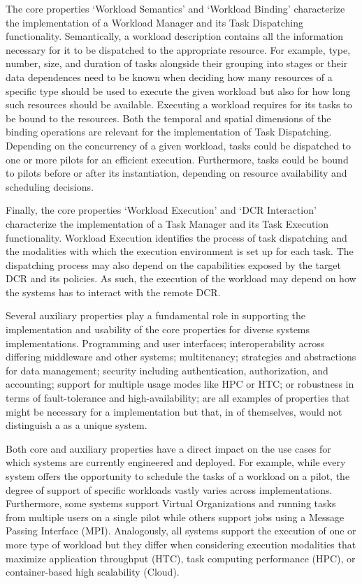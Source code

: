 \documentclass{sig-alternate}
\begin{document}
The core properties `Workload Semantics' and `Workload Binding' characterize the
implementation of a Workload Manager and its Task Dispatching functionality.
Semantically, a workload description contains all the information necessary for
it to be dispatched to the appropriate resource. For example, type, number,
size, and duration of tasks alongside their grouping into stages or their data
dependences need to be known when deciding how many resources of a specific type
should be used to execute the given workload but also for how long such
resources should be available. Executing a workload requires for its tasks to be
bound to the resources. Both the temporal and spatial dimensions of the binding
operations are relevant for the implementation of Task Dispatching. Depending on
the concurrency of a given workload, tasks could be dispatched to one or more
pilots for an efficient execution. Furthermore, tasks could be bound to pilots
before or after its instantiation, depending on resource availability and
scheduling decisions.

Finally, the core properties `Workload Execution' and `DCR Interaction'
characterize the implementation of a Task Manager and its Task Execution
functionality. Workload Execution identifies the process of task dispatching and
the modalities with which the execution environment is set up for each task. The
dispatching process may also depend on the capabilities exposed by the target
DCR and its policies. As such, the execution of the workload may depend on how
the \pilot systems has to interact with the remote DCR.

Several auxiliary properties play a fundamental role in supporting the
implementation and usability of the core properties for diverse \pilot systems
implementations. Programming and user interfaces; interoperability across
differing middleware and other \pilot systems; multitenancy; strategies and
abstractions for data management; security including authentication,
authorization, and accounting; support for multiple usage modes like HPC or HTC;
or robustness in terms of fault-tolerance and high-availability; are all
examples of properties that might be necessary for a \pilot implementation but
that, in of themselves, would not distinguish a \pilot as a unique system.

Both core and auxiliary properties have a direct impact on the use cases for
which \pilot systems are currently engineered and deployed. For example, while
every \pilot system offers the opportunity to schedule the tasks of a workload
on a pilot, the degree of support of specific workloads vastly varies across
implementations. Furthermore, some \pilot systems support Virtual Organizations
and running tasks from multiple users on a single pilot while others support
jobs using a Message Passing Interface (MPI). Analogously, all \pilot systems
support the execution of one or more type of workload but they differ when
considering execution modalities that maximize application throughput (HTC),
task computing performance (HPC), or container-based high scalability (Cloud).
\end{document}
